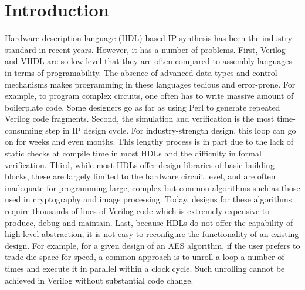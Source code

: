 \section{Introduction}\label{sec:intro}
Hardware description language (HDL)\cite{intro:HDL} based IP synthesis has been the 
industry standard in recent years.
However, it has a number of problems.
First, Verilog and VHDL are so low level that they are often compared to assembly languages
in terms of programability. The absence of advanced data types and control mechanisms makes
programming in these languages tedious and error-prone. For example, to program complex
circuits, one often has to write massive amount of boilerplate code. Some
designers go as far as using Perl to generate repeated Verilog code fragments. 
Second, the simulation and verification
is the most time-consuming step in IP design cycle. For industry-strength design, 
this loop can go on for weeks and even months. This lengthy process is in part due to
the lack of static checks at compile time in most HDLs and the difficulty in formal
verification.  Third, while most HDLs offer design libraries of basic building blocks,
these are largely limited to the hardware circuit level, and are often inadequate for programming
large, complex but common algorithms such as those used in cryptography and image processing.
Today, designs for these algorithms require thousands of lines of Verilog code which is
extremely expensive to produce, debug and maintain. Last, because HDLs do not offer the 
capability of high level abstraction, it is not easy to reconfigure the functionality of an
existing design. For example, for a given design of an AES algorithm, if the user prefers
to trade die space for speed, a common approach is to unroll a loop a number of times
and execute it in parallel within a clock cycle. Such unrolling cannot be achieved
in Verilog without substantial code change.

